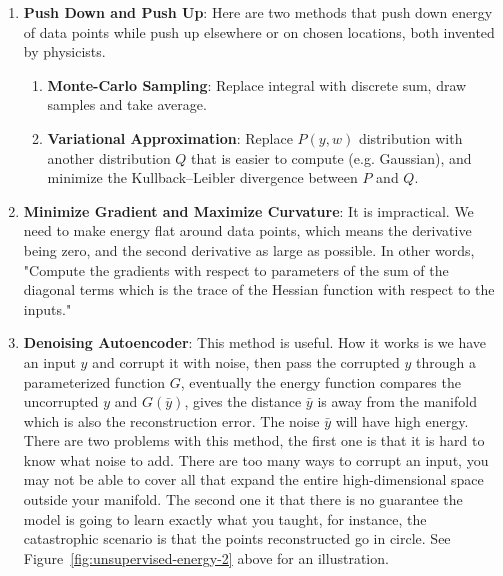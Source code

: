 \begin{enumerate}
    \item \textbf{Push Down and Push Up}: Here are two methods that push down energy of data points while push up elsewhere or on chosen locations, both invented by physicists.
    \begin{enumerate}
        \item \textbf{Monte-Carlo Sampling}: Replace integral with discrete sum, draw samples and take average.
        \item \textbf{Variational Approximation}: Replace $P(y, w)$ distribution with another distribution $Q$ that is easier to compute (e.g. Gaussian), and minimize the Kullback–Leibler divergence between $P$ and $Q$.
    \end{enumerate}

    \item \textbf{Minimize Gradient and Maximize Curvature}: It is impractical. We need to make energy flat around data points, which means the derivative being zero, and the second derivative as large as possible. In other words, "Compute the gradients with respect to parameters of the sum of the diagonal terms which is the trace of the Hessian function with respect to the inputs."

    \item \textbf{Denoising Autoencoder}: This method is useful. How it works is we have an input $y$ and corrupt it with noise, then pass the corrupted $y$ through a parameterized function $G$, eventually the energy function compares the uncorrupted $y$ and $G(\bar{y})$, gives the distance $\bar{y}$ is away from the manifold which is also the reconstruction error. The noise $\bar{y}$ will have high energy. There are two problems with this method, the first one is that it is hard to know what noise to add. There are too many ways to corrupt an input, you may not be able to cover all that expand the entire high-dimensional space outside your manifold. The second one it that there is no guarantee the model is going to learn exactly what you taught, for instance, the catastrophic scenario is that the points reconstructed go in circle. See Figure~\ref{fig:unsupervised-energy-2} above for an illustration.
\end{enumerate}
